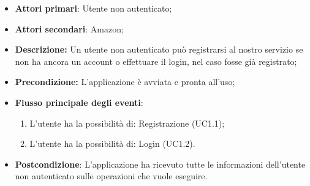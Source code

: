 \begin{itemize}
	\item \textbf{Attori primari}: Utente non autenticato;
	\item \textbf{Attori secondari}: Amazon;
	\item \textbf{Descrizione:} Un utente non autenticato può registrarsi al nostro servizio se non ha ancora un account o effettuare il login, nel caso fosse già registrato;
	\item \textbf{Precondizione:} L'applicazione è avviata e pronta all'uso;
	\item \textbf{Flusso principale degli eventi}:
	\begin{enumerate}
		\item L'utente ha la possibilità di: Registrazione (UC1.1);
		\item L'utente ha la possibilità di: Login (UC1.2).
	\end{enumerate}
	\item \textbf{Postcondizione}: L'applicazione ha ricevuto tutte le informazioni dell'utente non autenticato sulle operazioni che vuole eseguire.
\end{itemize}

